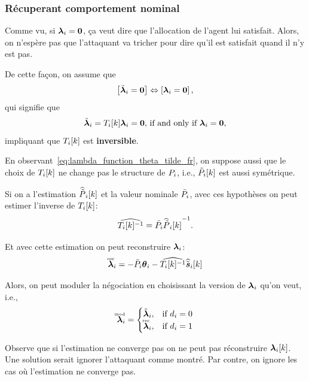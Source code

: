 \documentclass[../main.tex]{subfiles}
\begin{document}
\subsubsection{Récuperant comportement nominal}\label{sec:recov-nomin-behav_fr}
Comme vu, si $\boldsymbol{\lambda}_{i}=\mathbf{0}$, ça veut dire que l'allocation de l'agent lui satisfait.
Alors, on n'espère pas que l'attaquant va tricher pour dire qu'il est satisfait quand il n'y est pas.

De cette façon, on assume que
\begin{equation}
  \left[\tilde{\boldsymbol{\lambda}}_{i}=\mathbf{0} \right] \Leftrightarrow \left[\boldsymbol{\lambda}_{i}=\mathbf{0} \right],
\end{equation}
qui signifie que
\begin{equation}
  \label{eq:T_is_invertible}
  \tilde{\boldsymbol{\lambda}}_{i}=T_{i}[k]\boldsymbol{\lambda}_{i}=\mathbf{0}\text{, if and only if }\boldsymbol{\lambda}_{i}=\mathbf{0},
\end{equation}
impliquant que $T_{i}[k]$ est \textbf{inversible}.

En observant~\eqref{eq:lambda_function_theta_tilde_fr}, on suppose aussi que le choix de $T_{i}[k]$ ne change pas le structure de ${P}_{i}$, i.e., $\tilde{P}_{i}[k]$ est aussi symétrique.

Si on a l'estimation $\widehat{\tilde{P}}_{i}[k]$ et la valeur nominale $\bar{{P}}_{i}$, avec ces hypothèses on peut estimer l'inverse de $T_{i}[k]$:
\begin{equation}
  \label{eq:estimate_T_inverse_fr}
{\widehat{T_{i}[k]^{-1}}=\bar{{P}}_{i}{\widehat{\tilde{P}}_{i}[k]}^{-1}}.
\end{equation}

Et avec cette estimation on peut reconstruire $\boldsymbol{\lambda}_{i}$:
\begin{equation}
  \label{eq:lambdareconstruction}
  \accentset{\text{rec}}{\boldsymbol{\lambda}}_{i}=-\bar{{P}}_{i}\boldsymbol{\theta}_{i}-\widehat{T_{i}[k]^{-1}}\widehat{\tilde{\boldsymbol{s}}}_{i}[k]
\end{equation}

Alors, on peut moduler la négociation en choisissant la version de $\boldsymbol{\lambda}_{i}$ qu'on veut, i.e.,
\begin{equation}
  \accentset{\text{mod}}{\boldsymbol{\lambda}}_{i}=
          \begin{cases}
            \tilde{\boldsymbol{\lambda}}_{i}, &\text{if } d_{i}=0\\
            \accentset{\text{rec}}{\boldsymbol{\lambda}}_{i}, &\text{if }d_{i}=1\\
        \end{cases}
\end{equation}

\begin{remark}
  Observe que si l'estimation ne converge pas on ne peut pas réconstruire $\lambdaik$.
  Une solution serait ignorer l'attaquant comme montré.
  Par contre, on ignore les cas où l'estimation ne converge pas.
\end{remark}
\end{document}
